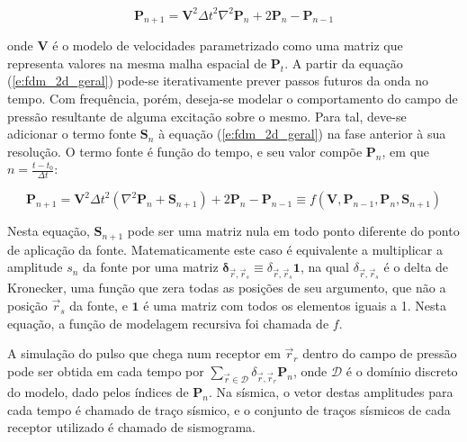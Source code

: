     \begin{equation} \label{e:fdm_2d_geral}
      \boldsymbol{P}_{n+1} =
        \boldsymbol{V}^2 {\Delta t}^2
        \nabla^2 \boldsymbol{P}_{n} +
        2 \boldsymbol{P}_{n} -
        \boldsymbol{P}_{n-1}
    \end{equation}

    \noindent onde $\boldsymbol{V}$ é o modelo de velocidades parametrizado como uma matriz que representa valores na mesma malha espacial de $\boldsymbol{P}_t$. A partir da equação (\ref{e:fdm_2d_geral}) pode-se iterativamente prever passos futuros da onda no tempo. Com frequência, porém, deseja-se modelar o comportamento do campo de pressão resultante de alguma excitação sobre o mesmo. Para tal, deve-se adicionar o termo fonte $\boldsymbol{S}_n$ à equação (\ref{e:fdm_2d_geral}) na fase anterior à sua resolução. O termo fonte é função do tempo, e seu valor compõe $\boldsymbol{P}_{n}$, em que $n=\frac{t-t_0}{\Delta t}$:

    \begin{equation} \label{e:fdm_2d_geral_com_fonte}
      \boldsymbol{P}_{n+1} =
        \boldsymbol{V}^2 {\Delta t}^2
        (\nabla^2 \boldsymbol{P}_{n} + \boldsymbol{S}_{n+1}) +
        2 \boldsymbol{P}_{n} -
        \boldsymbol{P}_{n-1}
        \equiv f(\boldsymbol{V}, \boldsymbol{P}_{n-1}, \boldsymbol{P}_n, \boldsymbol{S}_{n+1})
    \end{equation}

    Nesta equação, $\boldsymbol{S}_{n+1}$ pode ser uma matriz nula em todo ponto diferente do ponto de aplicação da fonte. Matematicamente este caso é equivalente a multiplicar a amplitude $s_n$ da fonte por uma matriz $\boldsymbol{\delta}_{\vec{r}, \vec{r}_s} \equiv \delta_{\vec{r}, \vec{r}_s} \boldsymbol{1}$, na qual $\delta_{\vec{r}, \vec{r}_s}$ é o delta de Kronecker, uma função que zera todas as posições de seu argumento, que não a posição $\vec{r}_s$ da fonte, e $\boldsymbol{1}$ é uma matriz com todos os elementos iguais a 1. Nesta equação, a função de modelagem recursiva foi chamada de $f$.

    A simulação do pulso que chega num receptor em $\vec{r}_r$ dentro do campo de pressão pode ser obtida em cada tempo por $\sum_{\vec{r} \in \mathcal{D}} \delta_{\vec{r}, \vec{r}_r} {\boldsymbol{P}_n}$, onde $\mathcal{D}$ é o domínio discreto do modelo, dado pelos índices de $\boldsymbol{P}_n$. Na sísmica, o vetor destas amplitudes para cada tempo é chamado de traço sísmico, e o conjunto de traços sísmicos de cada receptor utilizado é chamado de sismograma.

